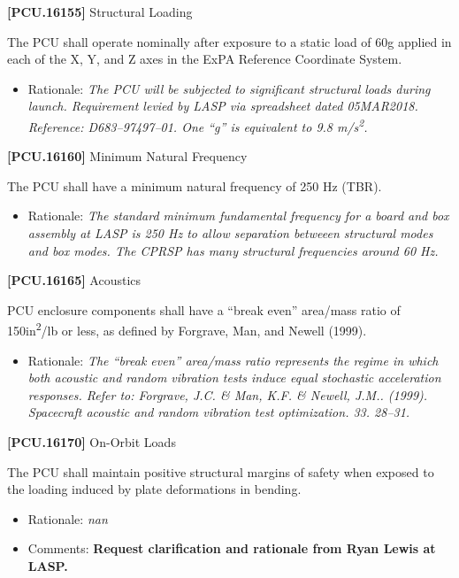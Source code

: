 \textbf{[PCU.16155]} Structural Loading

The \gls{PCU} shall operate nominally after exposure to a static load of 60g applied in each of the X, Y, and Z axes in the \gls{ExPA} Reference Coordinate System.

\begin{itemize}
\item{} Rationale: \emph{The PCU will be subjected to significant structural loads during launch. Requirement levied by LASP via spreadsheet dated 05MAR2018. Reference: D683--97497--01. One ``g'' is equivalent to 9.8 m\slash s\textsuperscript{2}.}

\end{itemize}

\textbf{[PCU.16160]} Minimum Natural Frequency

The \gls{PCU} shall have a minimum natural frequency of 250 Hz (TBR\label{tbx_16}).

\begin{itemize}
\item{} Rationale: \emph{The standard minimum fundamental frequency for a board and box assembly at LASP is 250 Hz to allow separation betweeen structural modes and box modes. The CPRSP has many structural frequencies around 60 Hz.}

\end{itemize}

\textbf{[PCU.16165]} Acoustics

\gls{PCU} enclosure components shall have a ``break even'' area\slash mass ratio of 150in\textsuperscript{2}\slash lb or less, as defined by Forgrave, Man, and Newell (1999).

\begin{itemize}
\item{} Rationale: \emph{The ``break even'' area\slash mass ratio represents the regime in which both acoustic and random vibration tests induce equal stochastic acceleration responses. Refer to: Forgrave, J.C. \& Man, K.F. \& Newell, J.M.. (1999). Spacecraft acoustic and random vibration test optimization. 33. 28--31.}

\end{itemize}

\textbf{[PCU.16170]} On-Orbit Loads

The \gls{PCU} shall maintain positive structural margins of safety when exposed to the loading induced by plate deformations in bending.

\begin{itemize}
\item{} Rationale: \emph{nan}

\item{} Comments: \textbf{Request clarification and rationale from Ryan Lewis at LASP.}

\end{itemize}


